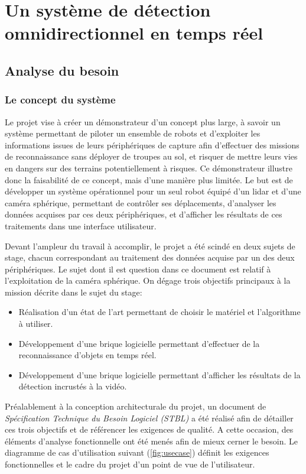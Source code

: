 \chapter{Un système de détection omnidirectionnel en temps réel}

	\section{Analyse du besoin}

		\subsection{Le concept du système}
			
			Le projet vise à créer un démonstrateur d'un concept plus large, à savoir un système permettant de piloter un ensemble de robots et d'exploiter les informations issues de leurs périphériques de capture afin d'effectuer des missions de reconnaissance sans déployer de troupes au sol, et risquer de mettre leurs vies en dangers sur des terrains potentiellement à risques. Ce démonstrateur illustre donc la faisabilité de ce concept, mais d'une manière plus limitée. Le but est de développer un système opérationnel pour un seul robot équipé d'un \gls{lidar} et d'une caméra sphérique, permettant de contrôler ses déplacements, d'analyser les données acquises par ces deux périphériques, et d'afficher les résultats de ces traitements dans une interface utilisateur.
			\par
			Devant l'ampleur du travail à accomplir, le projet a été scindé en deux sujets de stage, chacun correspondant au traitement des données acquise par un des deux périphériques. Le sujet dont il est question dans ce document est relatif à l'exploitation de la caméra sphérique. On dégage trois objectifs principaux à la mission décrite dans le sujet du stage:
			\begin{itemize}[noitemsep]
				\item Réalisation d'un état de l'art permettant de choisir le matériel et l'algorithme à utiliser.
				\item Développement d'une brique logicielle permettant d'effectuer de la reconnaissance d'objets en temps réel.
				\item Développement d'une brique logicielle permettant d'afficher les résultats de la détection incrustés à la vidéo.
			\end{itemize}
			\par
			Préalablement à la conception architecturale du projet, un document de \emph{Spécification Technique du Besoin Logiciel (STBL)} a été réalisé afin de détailler ces trois objectifs et de référencer les exigences de qualité. A cette occasion, des éléments d'analyse fonctionnelle ont été menés afin de mieux cerner le besoin. Le diagramme de cas d'utilisation suivant (\autoref{fig:usecase}) définit les exigences fonctionnelles et le cadre du projet d'un point de vue de l'utilisateur.
			
